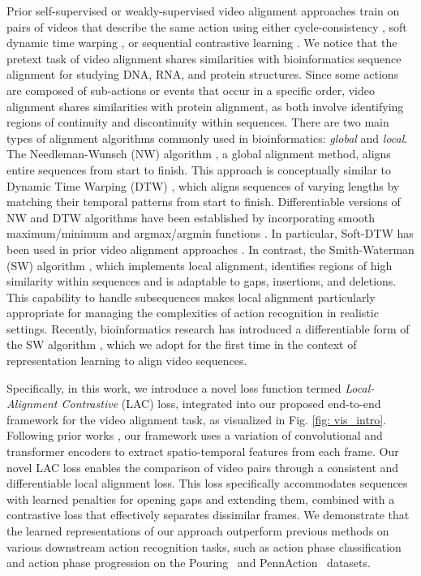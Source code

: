 Prior self-supervised or weakly-supervised video alignment approaches \cite{2017_tcn, 2019_tcc, 2021_lav, 2021_gta, 2022_carl, 2024_lrprop} train on pairs of videos that describe the same action using either cycle-consistency \cite{2019_tcc}, soft dynamic time warping \cite{2021_gta, 2021_lav}, or sequential contrastive learning \cite{2022_carl}.
We notice that the pretext task of video alignment shares similarities with bioinformatics sequence alignment for studying DNA, RNA, and protein structures. 
Since some actions are composed of sub-actions or events that occur in a specific order, video alignment shares similarities with protein alignment, as both involve identifying regions of continuity and discontinuity within sequences.
There are two main types of alignment algorithms commonly used in bioinformatics: \textit{global} and \textit{local}. 
The Needleman-Wunsch (NW) algorithm \cite{1970_nw}, a global alignment method, aligns entire sequences from start to finish. 
This approach is conceptually similar to Dynamic Time Warping (DTW) \cite{2007_dtw}, which aligns sequences of varying lengths by matching their temporal patterns from start to finish.
Differentiable versions of NW and DTW algorithms have been established by incorporating smooth maximum/minimum and argmax/argmin functions \cite{2020_diff_nw, 2017_softdtw}.
In particular, Soft-DTW \cite{2017_softdtw} has been used in prior video alignment approaches \cite{2021_lav, 2021_gta, 2024_lrprop}.
In contrast, the Smith-Waterman (SW) algorithm \cite{1981_sw}, which implements local alignment, identifies regions of high similarity within sequences and is adaptable to gaps, insertions, and deletions. 
This capability to handle subsequences makes local alignment particularly appropriate for managing the complexities of action recognition in realistic settings. 
Recently, bioinformatics research has introduced a differentiable form of the SW algorithm \cite{2023_sw1, 2023_sw2}, which we adopt for the first time in the context of representation learning to align video sequences.

Specifically, in this work, we introduce a novel loss function termed \textit{Local-Alignment Contrastive} (LAC) loss, integrated into our proposed end-to-end framework for the video alignment task, as visualized in Fig. \ref{fig: vis_intro}.
Following prior works \cite{2022_carl, 2024_lrprop}, our framework uses a variation of convolutional and transformer encoders to extract spatio-temporal features from each frame. 
Our novel LAC loss enables the comparison of video pairs through a consistent and differentiable local alignment loss. 
This loss specifically accommodates sequences with learned penalties for opening gaps and extending them, combined with a contrastive loss that effectively separates dissimilar frames.
We demonstrate that the learned representations of our approach outperform previous methods on various downstream action recognition tasks, such as action phase classification and action phase progression on the Pouring~\cite{2017_tcn} and PennAction~\cite{2013_pennaction} datasets. 


